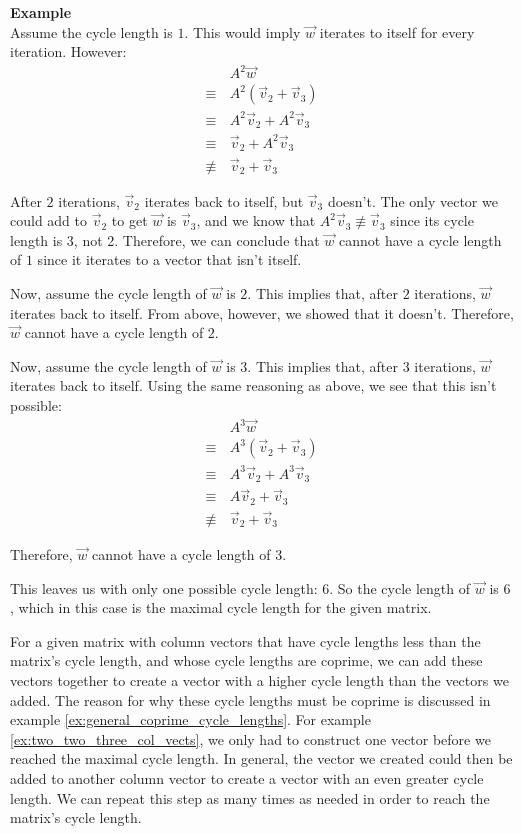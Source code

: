 \documentclass[a4paper, 12pt, reqno]{amsart}
\newcounter{mathexample}[section]
\newenvironment{mathexample}
{
	\refstepcounter{mathexample} %
	\textbf{Example \themathexample} 
	\\
}
{
	\vspace{1cm}
}
\begin{document}
\begin{mathexample}
		Assume the cycle length is $1$. This would imply $\vec{w}$ iterates to itself for every iteration.
		However:
		\begin{align*}
								 & \, A^{2}\vec{w}                        \\
			\equiv     & \, A^{2}(\vec{v}_{2} + \vec{v}_{3})    \\
			\equiv     & \, A^{2}\vec{v}_{2} + A^{2}\vec{v}_{3} \\
			\equiv     & \, \vec{v}_{2} + A^{2}\vec{v}_{3}      \\
			\not\equiv & \, \vec{v}_{2} + \vec{v}_{3}
		\end{align*}
		
		After $2$ iterations, $\vec{v}_{2}$ iterates back to itself, but $\vec{v}_{3}$ doesn't. The only
		vector we could add to $\vec{v}_{2}$ to get $\vec{w}$ is $\vec{v}_{3}$, and we know that
		$A^{2}\vec{v}_{3} \not\equiv \vec{v}_{3}$ since its cycle length is 3, not 2. Therefore, we can
		conclude that $\vec{w}$ cannot have a cycle length of $1$ since it iterates to a vector that
		isn't itself.
		
		Now, assume the cycle length of $\vec{w}$ is $2$. This implies that, after $2$ iterations,
		$\vec{w}$ iterates back to itself. From above, however, we showed that it doesn't. Therefore,
		$\vec{w}$ cannot have a cycle length of $2$.
		
		Now, assume the cycle length of $\vec{w}$ is $3$. This implies that, after $3$ iterations,
		$\vec{w}$ iterates back to itself. Using the same reasoning as above, we see that this
		isn't possible:
		\begin{align*}
								 & \, A^{3}\vec{w}                        \\
			\equiv     & \, A^{3}(\vec{v}_{2} + \vec{v}_{3})    \\
			\equiv     & \, A^{3}\vec{v}_{2} + A^{3}\vec{v}_{3} \\
			\equiv     & \, A\vec{v}_{2} + \vec{v}_{3}      \\
			\not\equiv & \, \vec{v}_{2} + \vec{v}_{3}
		\end{align*}
		
		Therefore, $\vec{w}$ cannot have a cycle length of $3$.
		
		This leaves us with only one possible cycle length: $6$. So the cycle length of $\vec{w}$ is $6$,
		which in this case is the maximal cycle length for the given matrix.
	\end{mathexample}
	
	For a given matrix with column vectors that have cycle lengths less than the matrix's cycle length, 
	and whose cycle lengths are coprime, we can add these vectors together to create a vector with a higher 
	cycle length than the vectors we added. The reason for why these cycle lengths must be coprime is
	discussed in example \ref{ex:general_coprime_cycle_lengths}. For example \ref{ex:two_two_three_col_vects}, 
	we only had to construct one vector before we reached the maximal cycle length. In general, the vector 
	we created could then be added to another column vector to create a vector with an even greater cycle 
	length. We can repeat this step as many times as needed in order to reach the matrix's cycle length.
	
\end{document}
